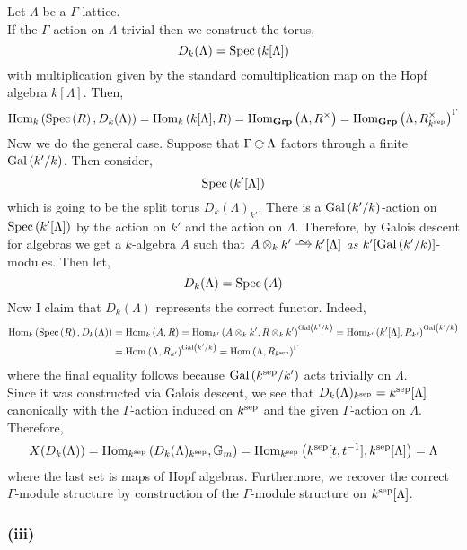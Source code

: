 \documentclass[12pt]{article}
\begin{document}
Let $\Lambda$ be a $\Gamma$-lattice. 
\bigskip\\
If the $\Gamma$-action on $\Lambda$ trivial then we construct the torus,
\[ D_k(\Lambda) = \mathrm{Spec}\left( k[\Lambda] \right) \]
with multiplication given by the standard comultiplication map on the Hopf algebra $k[\Lambda]$. Then,
\[ \mathrm{Hom}_{k} \left( \mathrm{Spec}\left( R \right), D_k(\Lambda) \right) = \mathrm{Hom}_{k} \left( k[\Lambda], R \right) = \mathrm{Hom}_{\mathbf{Grp}} \left( \Lambda, R^\times \right) = \mathrm{Hom}_{\mathbf{Grp}} \left( \Lambda, R^\times_{k^{\mathrm{sep}}} \right)^{\Gamma} \]
Now we do the general case. Suppose that $\Gamma \acts \Lambda$ factors through a finite $\mathrm{Gal}\left( k'/k \right)$. Then consider,
\[ \mathrm{Spec}\left( k'[\Lambda] \right) \]
which is going to be the split torus $D_k(\Lambda)_{k'}$. There is a $\mathrm{Gal}\left( k'/k \right)$-action on $\mathrm{Spec}\left( k'[\Lambda] \right)$ by the action on $k'$ and the action on $\Lambda$. Therefore, by Galois descent for algebras we get a $k$-algebra $A$ such that $A \otimes_k k' \iso k'[\Lambda]$ \textit{as} $k'[\mathrm{Gal}\left( k'/k \right)]$-modules. Then let,
\[ D_k(\Lambda) = \mathrm{Spec}\left( A \right) \]
Now I claim that $D_k(\Lambda)$ represents the correct functor. Indeed,
\begin{align*}
\mathrm{Hom}_{k} \left( \mathrm{Spec}\left( R \right), D_k(\Lambda) \right) & = \mathrm{Hom}_{k} \left( A, R \right) = \mathrm{Hom}_{k'} \left( A \otimes_k k', R \otimes_k k' \right)^{\mathrm{Gal}\left( k'/k \right)} = \mathrm{Hom}_{k'} \left( k'[\Lambda], R_{k'} \right)^{\mathrm{Gal}\left( k'/k \right)} 
\\
& = \mathrm{Hom}_{} \left( \Lambda, R_{k'} \right)^{\mathrm{Gal}\left( k'/k \right)} = \mathrm{Hom}_{} \left( \Lambda, R_{k^{\mathrm{sep}}} \right)^{\Gamma} 
\end{align*}  
where the final equality follows because $\mathrm{Gal}\left( k^{\mathrm{sep}}/k' \right)$ acts trivially on $\Lambda$.
\bigskip\\
Since it was constructed via Galois descent, we see that $D_k(\Lambda)_{k^{\mathrm{sep}}} = k^{\mathrm{sep}}[\Lambda]$ canonically with the $\Gamma$-action induced on $k^{\mathrm{sep}}$ and the given $\Gamma$-action on $\Lambda$. Therefore,
\[ X(D_k(\Lambda)) = \mathrm{Hom}_{k^{\mathrm{sep}}} \left( D_k(\Lambda)_{k^{\mathrm{sep}}}, \mathbb{G}_m \right) = \mathrm{Hom}_{k^{\mathrm{sep}}} \left( k^{\mathrm{sep}}[t,t^{-1}], k^{\mathrm{sep}}[\Lambda] \right) = \Lambda \]
where the last set is maps of Hopf algebras. Furthermore, we recover the correct $\Gamma$-module structure by construction of the $\Gamma$-module structure on $k^{\mathrm{sep}}[\Lambda]$.

\subsubsection{(iii)}
\end{document}
